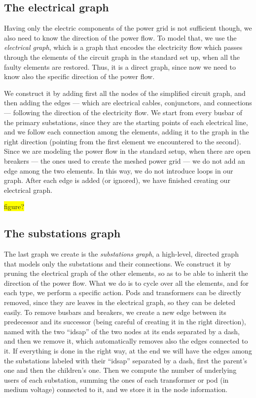 \subsection{The electrical graph}

Having only the electric components of the power grid is not sufficient though, we also need to know the direction of the power flow. To model that, we use the \emph{electrical graph}, which is a graph that encodes the electricity flow which passes through the elements of the circuit graph in the standard set up, when all the faulty elements are restored. Thus, it is a direct graph, since now we need to know also the specific direction of the power flow.

We construct it by adding first all the nodes of the simplified circuit graph, and then adding the edges --- which are electrical cables, conjunctors, and connections --- following the direction of the electricity flow. We start from every busbar of the primary substations, since they are the starting points of each electrical line, and we follow each connection among the elements, adding it to the graph in the right direction (pointing from the first element we encountered to the second). Since we are modeling the power flow in the standard setup, when there are open breakers --- the ones used to create the meshed power grid --- we do not add an edge among the two elements. In this way, we do not introduce loops in our graph. After each edge is added (or ignored), we have finished creating our electrical graph.

\colorbox{yellow}{figure?}


\subsection{The substations graph}

The last graph we create is the \emph{substations graph}, a high-level, directed graph that models only the substations and their connections. We construct it by pruning the electrical graph of the other elements, so as to be able to inherit the direction of the power flow. What we do is to cycle over all the elements, and for each type, we perform a specific action. Pods and transformers can be directly removed, since they are leaves in the electrical graph, so they can be deleted easily. To remove busbars and breakers, we create a new edge between its predecessor and its successor (being careful of creating it in the right direction), named with the two ``idsap'' of the two nodes at its ends separated by a dash, and then we remove it, which automatically removes also the edges connected to it. If everything is done in the right way, at the end we will have the edges among the substations labeled with their ``idsap'' separated by a dash, first the parent's one and then the children's one. Then we compute the number of underlying users of each substation, summing the ones of each transformer or pod (in medium voltage) connected to it, and we store it in the node information.

